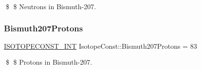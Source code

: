 \$ \$ Neutrons in Bismuth-\/207. \mbox{\label{group___isotope_const-_bismuth-_bi207_ga72cf3d87bc584173f7586bf90d2bf021}} 
\subsubsection{\texorpdfstring{Bismuth207\+Protons}{Bismuth207Protons}}
{\footnotesize\ttfamily \mbox{\hyperlink{group___isotope_const-_macros_ga5f18360b3e99483a35c32d789e62621c}{I\+S\+O\+T\+O\+P\+E\+C\+O\+N\+S\+T\+\_\+\+I\+NT}} Isotope\+Const\+::\+Bismuth207\+Protons = 83}

\$ \$ Protons in Bismuth-\/207. 